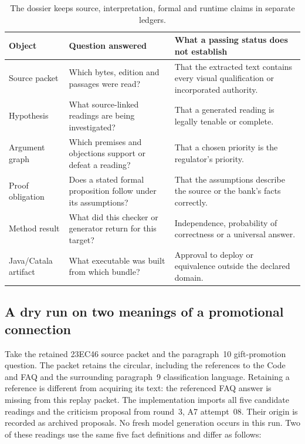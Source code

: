 \begin{table}[H]
\centering\small
\begin{tabularx}{\textwidth}{P{0.19\textwidth}Y Y}
\toprule
Object & Question answered & What a passing status does not establish \\
\midrule
Source packet & Which bytes, edition and passages were read? & That the extracted text contains every visual qualification or incorporated authority. \\
Hypothesis & What source-linked readings are being investigated? & That a generated reading is legally tenable or complete. \\
Argument graph & Which premises and objections support or defeat a reading? & That a chosen priority is the regulator's priority. \\
Proof obligation & Does a stated formal proposition follow under its assumptions? & That the assumptions describe the source or the bank's facts correctly. \\
Method result & What did this checker or generator return for this target? & Independence, probability of correctness or a universal answer. \\
Java/Catala artifact & What executable was built from which bundle? & Approval to deploy or equivalence outside the declared domain. \\
\bottomrule
\end{tabularx}
\caption{The dossier keeps source, interpretation, formal and runtime claims in separate ledgers.}
\label{tab:proof-carrying-boundaries}
\end{table}

\subsection{A dry run on two meanings of a promotional connection}

Take the retained 23EC46 source packet and the paragraph~10 gift-promotion
question. The packet retains the circular, including the references to the Code
and FAQ and the surrounding paragraph~9 classification language. Retaining a
reference is different from acquiring its text: the referenced FAQ answer is
missing from this replay packet. The implementation imports all five candidate
readings and the criticism proposal from round~3, A7 attempt~08. Their origin is
recorded as archived proposals. No fresh model generation occurs in this run.
Two of these readings use the same five fact definitions and differ as follows:

